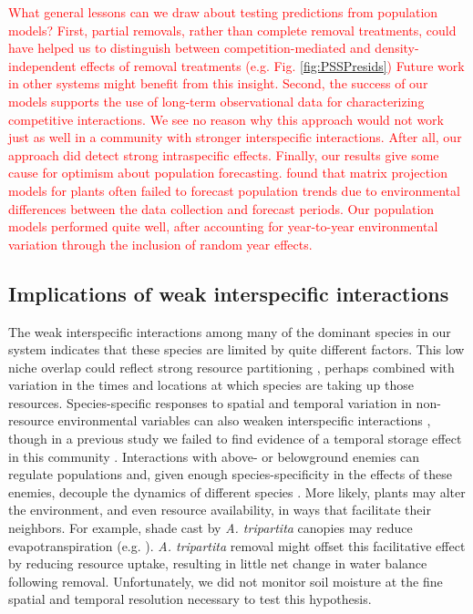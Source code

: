 \documentclass[11pt]{article}
\newcommand{\new}{\textcolor{red}}
\begin{document}
\begin{doublespacing}
\new{What general lessons can we draw about testing predictions from population models? 
First, partial removals, rather than complete removal treatments, could 
have helped us to distinguish between competition-mediated and density-independent effects of removal treatments (e.g. Fig. \ref{fig:PSSPresids}) 
Future work in other systems might benefit from this insight. Second, the success of our models supports 
the use of long-term observational data for characterizing competitive interactions. We see no reason why 
this approach would not work just as well in a community with stronger 
interspecific interactions. After all, our approach did detect strong intraspecific effects. 
Finally, our results give some cause for optimism about population forecasting.
\citet{Crone2013} found that matrix projection models for plants often failed to forecast population trends due 
to environmental differences between the data collection and forecast periods. Our population models 
performed quite well, after accounting for year-to-year environmental variation through the inclusion of
random year effects.}

\subsection*{Implications of weak interspecific interactions}

The weak interspecific interactions among many of the dominant species in our system indicates that these species  
are limited by quite different factors. This low niche overlap could reflect strong resource partitioning \citep{tilman_resource_1982}, 
perhaps combined with variation in the times and locations at which species are taking up those resources. 
Species-specific responses to spatial and temporal variation in non-resource environmental variables can also weaken interspecific 
interactions \citep{chesson_mechanisms_2000}, though in a previous study we failed to find evidence of a temporal storage effect 
in this community \citep{adler_weak_2009}. Interactions with above- or belowground enemies can regulate populations and, given 
enough species-specificity in the effects of these enemies, decouple the dynamics of different species \citep{hersh_evaluating_2011,
janzen_herbivores_1970,connell_role_1971}.  More likely, plants may alter the environment, and even resource availability, 
in ways that facilitate their neighbors. For example, shade cast by \textit{A. tripartita} canopies may reduce 
evapotranspiration (e.g. \citealt{Barbier2008}). \textit{A. tripartita} removal might offset this facilitative effect by reducing 
resource uptake, resulting in little net change in water balance following removal. 
Unfortunately, we did not monitor soil moisture at the fine spatial and temporal resolution necessary to test this hypothesis.


\end{doublespacing}
\end{document}
